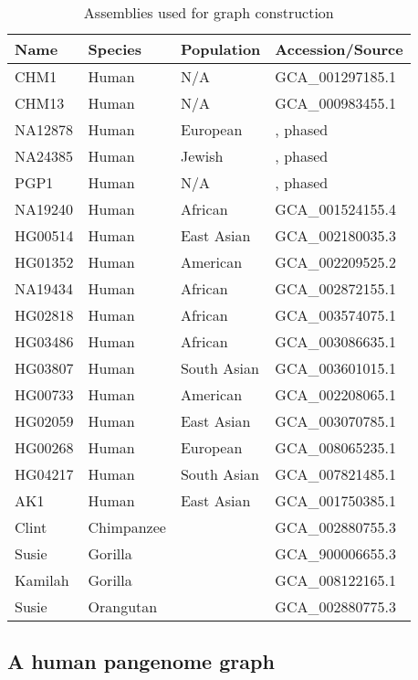 \documentclass[twocolumn]{bmcart}%
\begin{document}
\begin{table}[tb]
\caption{Assemblies used for graph construction}\label{tab:asm}
\begin{tabular}{llll}
\hline
Name & Species & Population  & Accession/Source \\ \hline
CHM1 & Human   & N/A         & GCA\_001297185.1 \\
CHM13 & Human  & N/A         & GCA\_000983455.1 \\
NA12878 & Human & European   & \cite{Garg810341}, phased \\
NA24385 & Human & Jewish     & \cite{Garg810341}, phased \\
PGP1 & Human & N/A           & \cite{Garg810341}, phased \\
NA19240 & Human & African    & GCA\_001524155.4 \\
HG00514 & Human & East Asian & GCA\_002180035.3 \\
HG01352 & Human & American   & GCA\_002209525.2 \\
NA19434 & Human & African    & GCA\_002872155.1 \\
HG02818 & Human & African    & GCA\_003574075.1 \\
HG03486 & Human & African    & GCA\_003086635.1 \\
HG03807 & Human & South Asian& GCA\_003601015.1 \\
HG00733 & Human & American   & GCA\_002208065.1 \\
HG02059 & Human & East Asian & GCA\_003070785.1 \\
HG00268 & Human & European   & GCA\_008065235.1 \\
HG04217 & Human & South Asian& GCA\_007821485.1 \\
AK1     & Human & East Asian & GCA\_001750385.1 \\
Clint   & Chimpanzee &       & GCA\_002880755.3 \\
Susie   & Gorilla &          & GCA\_900006655.3 \\
Kamilah & Gorilla &          & GCA\_008122165.1 \\
Susie   & Orangutan &        & GCA\_002880775.3 \\
\hline
\end{tabular}
\end{table}

\subsection*{A human pangenome graph}
\end{document}
